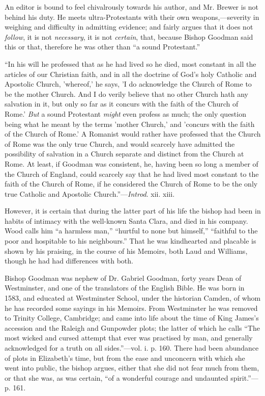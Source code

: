 An editor is bound to feel chivalrously towards his
author, and Mr. Brewer is not behind his duty. He meets
ultra-Protestants with their own weapons,—severity in weighing and
difficulty in admitting evidence; and fairly argues that it does not \emph{follow},
it is not \emph{necessary}, it is not \emph{certain}, that, because
Bishop Goodman said this or that, therefore he was other than ``a sound
Protestant.''

``In his will he professed that as he
had lived so he died, most constant in all the articles of our Christian
faith, and in all the doctrine of God's holy Catholic and Apostolic
Church, 'whereof,' he says, 'I do acknowledge the Church of Rome to be
the mother Church. And I do verily believe that no other Church hath any
salvation in it, but only so far as it concurs with the faith of the
Church of Rome.' \emph{But} a sound Protestant \emph{might} even profess
as much; the only question being what he meant by the terms 'mother
Church,' and 'concurs with the faith of the Church of Rome.' A Romanist
would rather have professed that the Church of Rome was the only true
Church, and would scarcely have admitted the possibility of salvation in
a Church separate and distinct from the Church at Rome. At least, if
Goodman was consistent, he, having been so long a member of the Church
of England, could scarcely say that he had lived most constant to the
faith of the Church of Rome, if he considered the Church of Rome to be
the only true Catholic and Apostolic Church.''—\emph{Introd}. xii.
xiii.

However, it is certain that during the latter part
of his life the bishop had been in habits of intimacy with the
well-known Santa Clara, and died in his company. Wood calls him ``a
harmless man,'' ``hurtful to none but himself,'' ``faithful to the poor and
hospitable to his neighbours.'' That he was kindhearted and placable is
shown by his praising, in the course of his Memoirs, both Laud and
Williams, though he had had differences with both.

Bishop Goodman was nephew of Dr. Gabriel Goodman,
forty years Dean of Westminster, and one of the translators of the
English Bible. He was born in 1583, and educated at Westminster School,
under the historian Camden, of whom he has recorded some sayings in his
Memoirs. From Westminster he was removed to Trinity College, Cambridge;
and came into life about the time of King James's accession and the
Raleigh and Gunpowder plots; the latter of which he calls ``The most
wicked and cursed attempt that ever was practised by man, and generally
acknowledged for a truth on all sides.''—vol. i. p. 160. There had been
abundance of plots in Elizabeth's time, but from the ease and unconcern
with which she went into public, the bishop argues, either that she did
not fear much from them, or that she was, as was certain, ``of a
wonderful courage and undaunted spirit.''—p. 161.

